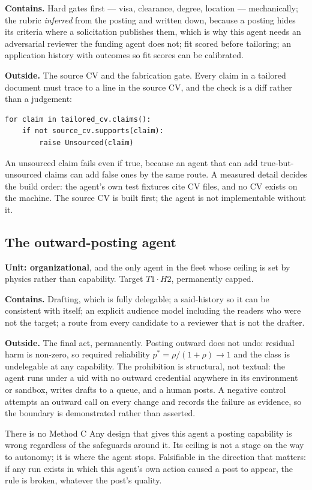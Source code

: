 \documentclass[11pt]{article}
\theoremstyle{definition}
\begin{document}
\textbf{Contains.} Hard gates first --- visa, clearance, degree, location --- mechanically; the rubric \emph{inferred} from the posting and written down, because a posting hides its criteria where a solicitation publishes them, which is why this agent needs an adversarial reviewer the funding agent does not; fit scored before tailoring; an application history with outcomes so fit scores can be calibrated.

\textbf{Outside.} The source CV and the fabrication gate. Every claim in a tailored document must trace to a line in the source CV, and the check is a diff rather than a judgement:
\begin{verbatim}
for claim in tailored_cv.claims():
    if not source_cv.supports(claim):
        raise Unsourced(claim)
\end{verbatim}
An unsourced claim fails even if true, because an agent that can add true-but-unsourced claims can add false ones by the same route. A measured detail decides the build order: the agent's own test fixtures cite CV files, and no CV exists on the machine. The source CV is built first; the agent is not implementable without it.

\subsection{The outward-posting agent}\label{sec:social}

\textbf{Unit: organizational}, and the only agent in the fleet whose ceiling is set by physics rather than capability. Target $T1\cdot H2$, permanently capped.

\textbf{Contains.} Drafting, which is fully delegable; a said-history so it can be consistent with itself; an explicit audience model including the readers who were not the target; a route from every candidate to a reviewer that is not the drafter.

\textbf{Outside.} The final act, permanently. Posting outward does not undo: residual harm is non-zero, so required reliability $p^{*} = \rho/(1+\rho) \to 1$ and the class is undelegable at any capability. The prohibition is structural, not textual: the agent runs under a uid with no outward credential anywhere in its environment or sandbox, writes drafts to a queue, and a human posts. A negative control attempts an outward call on every change and records the failure as evidence, so the boundary is demonstrated rather than asserted.

\begin{cautionbox}{There is no Method C}
Any design that gives this agent a posting capability is wrong regardless of the safeguards around it. Its ceiling is not a stage on the way to autonomy; it is where the agent stops. Falsifiable in the direction that matters: if any run exists in which this agent's own action caused a post to appear, the rule is broken, whatever the post's quality.
\end{cautionbox}
\end{document}
